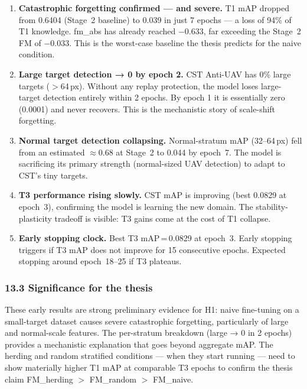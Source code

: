 \begin{enumerate}
    \item \textbf{Catastrophic forgetting confirmed — and severe.}
    T1 mAP dropped from 0.6404 (Stage~2 baseline) to 0.039 in just
    7 epochs — a loss of 94\% of T1 knowledge. fm\_abs has already
    reached $-0.633$, far exceeding the Stage~2 FM of $-0.033$.
    This is the worst-case baseline the thesis predicts for the naive
    condition.

    \item \textbf{Large target detection → 0 by epoch 2.}
    CST Anti-UAV has 0\% large targets ($>$64\,px). Without any
    replay protection, the model loses large-target detection entirely
    within 2 epochs. By epoch 1 it is essentially zero (0.0001) and
    never recovers. This is the mechanistic story of scale-shift
    forgetting.

    \item \textbf{Normal target detection collapsing.}
    Normal-stratum mAP (32--64\,px) fell from an estimated $\approx$0.68
    at Stage~2 to 0.044 by epoch~7. The model is sacrificing its
    primary strength (normal-sized UAV detection) to adapt to
    CST's tiny targets.

    \item \textbf{T3 performance rising slowly.}
    CST mAP is improving (best 0.0829 at epoch~3), confirming
    the model is learning the new domain. The stability-plasticity
    tradeoff is visible: T3 gains come at the cost of T1 collapse.

    \item \textbf{Early stopping clock.}
    Best T3 mAP\,=\,0.0829 at epoch~3. Early stopping triggers if
    T3 mAP does not improve for 15 consecutive epochs. Expected
    stopping around epoch~18--25 if T3 plateaus.
\end{enumerate}

\subsubsection*{13.3 Significance for the thesis}

These early results are strong preliminary evidence for H1: naive
fine-tuning on a small-target dataset causes severe catastrophic
forgetting, particularly of large and normal-scale features. The
per-stratum breakdown (large → 0 in 2 epochs) provides a mechanistic
explanation that goes beyond aggregate mAP. The herding and random
stratified conditions — when they start running — need to show
materially higher T1 mAP at comparable T3 epochs to confirm the
thesis claim FM\_herding $>$ FM\_random $>$ FM\_naive.


